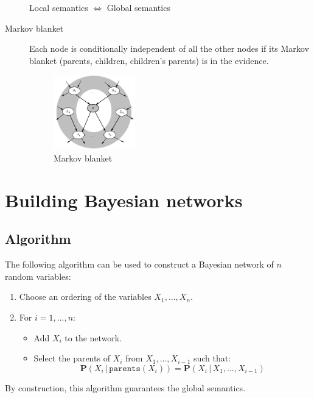 \begin{description}
        \begin{theorem}
            Local semantics $\iff$ Global semantics
        \end{theorem}
        
    
    \item[Markov blanket]
        Each node is conditionally independent of all the other nodes 
        if its Markov blanket (parents, children, children's parents) is in the evidence.
        \begin{figure}[H]
            \centering
            \includegraphics[width=0.35\textwidth]{img/_markov_blanket.pdf}
            \caption{Markov blanket}
        \end{figure}
\end{description}



\section{Building Bayesian networks}

\subsection{Algorithm}
The following algorithm can be used to construct a Bayesian network of $n$ random variables:
\begin{enumerate}
    \item Choose an ordering of the variables $X_1, \dots, X_n$.
    \item For $i=1, \dots, n$:
        \begin{itemize}
            \item Add $X_i$ to the network.
            \item Select the parents of $X_i$ from $X_1, \dots, X_{i-1}$ such that:
                \[ \textbf{P}(X_i \,\vert\, \texttt{parents}(X_i)) = 
                    \textbf{P}(X_i \,\vert\, X_1, \dots, X_{i-1}) \]
        \end{itemize}
\end{enumerate}
By construction, this algorithm guarantees the global semantics.

